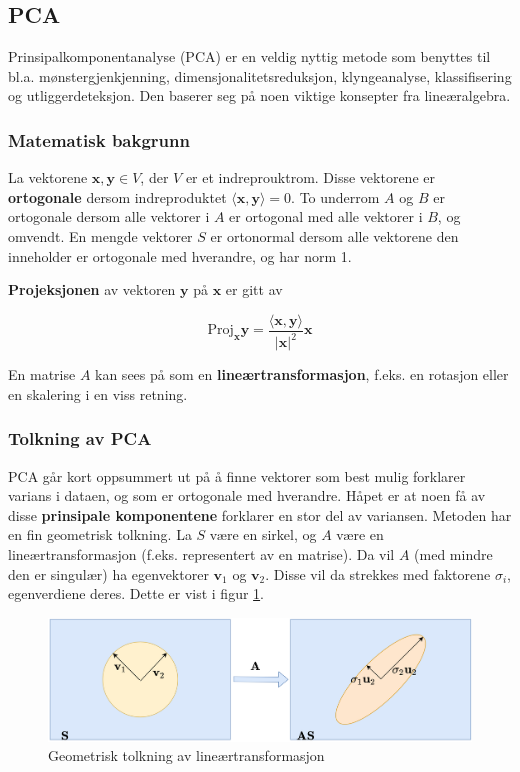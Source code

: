 \subsection{PCA}
Prinsipalkomponentanalyse (PCA) er en veldig nyttig metode som benyttes til bl.a. mønstergjenkjenning, dimensjonalitetsreduksjon, klyngeanalyse, klassifisering og utliggerdeteksjon. Den baserer seg på noen viktige konsepter fra lineæralgebra.

\subsubsection{Matematisk bakgrunn}

La vektorene $\mathbf{x}, \mathbf{y} \in V$, der $V$ er et indreprouktrom. Disse vektorene er \textbf{ortogonale} dersom indreproduktet $\langle \mathbf{x}, \mathbf{y} \rangle = 0$. To underrom $A$ og $B$ er ortogonale dersom alle vektorer i $A$ er ortogonal med alle vektorer i $B$, og omvendt. En mengde vektorer $S$ er ortonormal dersom alle vektorene den inneholder er ortogonale med hverandre, og har norm 1.

\textbf{Projeksjonen} av vektoren $\mathbf{y}$ på $\mathbf{x}$ er gitt av

\begin{equation}
\textrm{Proj}_{\mathbf{x}} \mathbf{y} = \frac{\langle \mathbf{x}, \mathbf{y} \rangle}{|\mathbf{x}|^2}\mathbf{x}
	\label{eq_projection}
\end{equation}

En matrise $A$ kan sees på som en \textbf{lineærtransformasjon}, f.eks. en rotasjon eller en skalering i en viss retning.

\subsubsection{Tolkning av PCA}
PCA går kort oppsummert ut på å finne vektorer som best mulig forklarer varians i dataen, og som er ortogonale med hverandre. Håpet er at noen få av disse \textbf{prinsipale komponentene} forklarer en stor del av variansen. Metoden har en fin geometrisk tolkning. La $S$ være en sirkel, og $A$ være en lineærtransformasjon (f.eks. representert av en matrise). Da vil $A$ (med mindre den er singulær) ha egenvektorer $\mathbf{v}_1$ og $\mathbf{v}_2$. Disse vil da strekkes med faktorene $\sigma_i$, egenverdiene deres. Dette er vist i figur \ref{fig:pca_skvis}.

\begin{figure}[h]
	\centering
	\includegraphics[width=\textwidth]{figurer/pca_skvis}
	\caption{Geometrisk tolkning av lineærtransformasjon}
	\label{fig:pca_skvis}
\end{figure}

